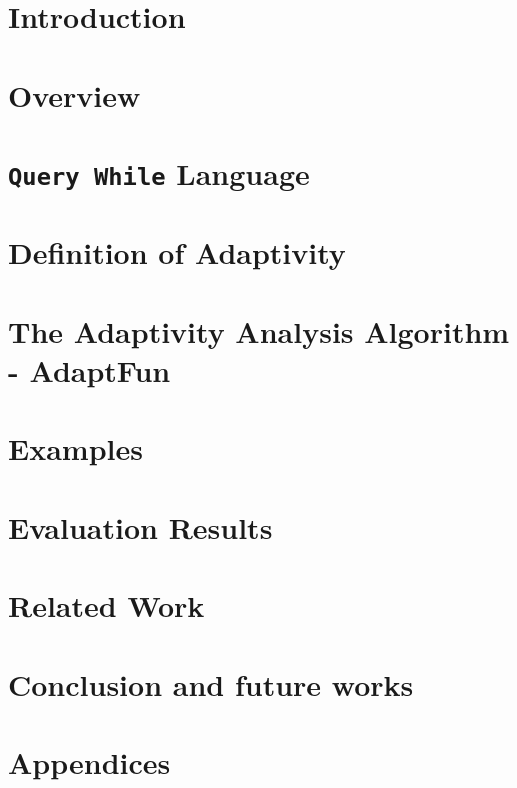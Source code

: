 \documentclass[a4paper,11pt]{article}
\newcommand{\THESYSTEM}{\textsf{AdaptFun}}
\begin{document}
\section{Introduction}
\label{sec:intro}

\section{Overview}
\label{sec:overview}

\clearpage

\section{{\tt Query While} Language}
\label{sec:language}

\clearpage
% 
% 
\section{Definition of Adaptivity}
\label{sec:adaptivity}

\clearpage
\section{The Adaptivity Analysis Algorithm - {\THESYSTEM}}
\label{sec:algorithm}


\section{Examples}
\label{sec:examples}


\section{Evaluation Results}



\section{Related Work}

\section{Conclusion and future works}


%
\clearpage
\appendix
{}
\section*{Appendices}



\end{document}

